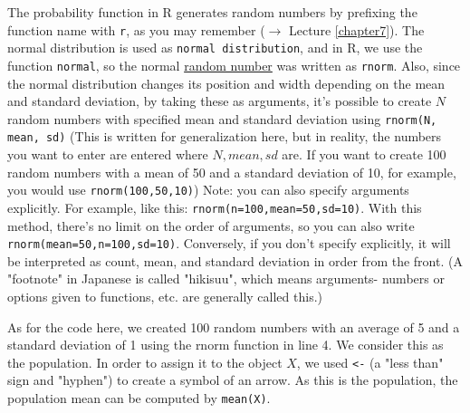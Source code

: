 \documentclass{ltjsbook}
\begin{document}
The probability function in R generates random numbers by prefixing the function name with \texttt{r}, as you may remember ($\to$ Lecture \ref{chapter7}).
The normal distribution is used as \verb|normal distribution|, and in R, we use the function \texttt{normal}, so the normal \underline{random number} was written as \texttt{rnorm}. Also, since the normal distribution changes its position and width depending on the mean and standard deviation, by taking these as arguments, it's possible to create $N$ random numbers with specified mean and standard deviation using \texttt{rnorm(N, mean, sd)} (This is written for generalization here, but in reality, the numbers you want to enter are entered where $N,mean,sd$ are. If you want to create 100 random numbers with a mean of 50 and a standard deviation of 10, for example, you would use \texttt{rnorm(100,50,10)}) Note: you can also specify arguments explicitly. For example, like this: \texttt{rnorm(n=100,mean=50,sd=10)}. With this method, there's no limit on the order of arguments, so you can also write \texttt{rnorm(mean=50,n=100,sd=10)}. Conversely, if you don't specify explicitly, it will be interpreted as count, mean, and standard deviation in order from the front.
(A "footnote" in Japanese is called "hikisuu", which means arguments- numbers or options given to functions, etc. are generally called this.)


As for the code here, we created 100 random numbers with an average of 5 and a standard deviation of 1 using the rnorm function in line 4. We consider this as the population. In order to assign it to the object $X$, we used \verb|<-| (a "less than" sign and "hyphen") to create a symbol of an arrow. As this is the population, the population mean can be computed by \texttt{mean(X)}.
\end{document}
